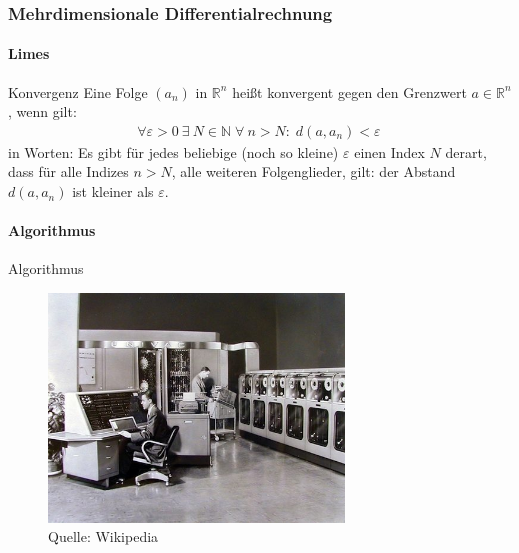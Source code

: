 \documentclass{beamer}
\begin{document}
\begin{frame}
    \frametitle{Mehrdimensionale Differentialrechnung}
\framesubtitle{Limes}
    \begin{block}{Konvergenz}
Eine Folge $(a_n)$ in $\mathbb{R}^n$ heißt konvergent gegen den Grenzwert $a \in \mathbb{R}^n$, wenn gilt:
\begin{align*}
\forall {\varepsilon > 0} \ \exists \ N \in \mathbb{N} \; \forall \ n > N: \; d(a, a_n) < \varepsilon\,
\end{align*}
in Worten: Es gibt für jedes beliebige (noch so kleine) $\varepsilon$ einen Index $N$ derart, dass für alle Indizes $n > N$, alle weiteren Folgenglieder, gilt: der Abstand $d(a, a_n)$ ist kleiner als $\varepsilon$.
\end{block}
 \end{frame}



\begin{frame}
\framesubtitle{Algorithmus}
    \begin{block}{Algorithmus}
\begin{figure}[H]
      \centering
    \includegraphics[width=0.7\textwidth]{images/computer}
      \caption{Quelle: Wikipedia}
\end{figure}
\end{block}

 \end{frame}
\end{document}
